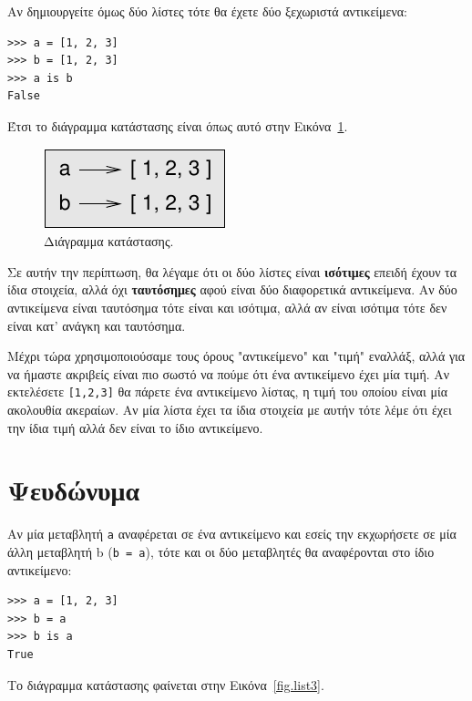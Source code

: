 \documentclass[10pt]{book}
\begin{document}
Αν δημιουργείτε όμως δύο λίστες τότε θα έχετε δύο ξεχωριστά αντικείμενα:

\begin{verbatim}
>>> a = [1, 2, 3]
>>> b = [1, 2, 3]
>>> a is b
False
\end{verbatim}
%
Έτσι το διάγραμμα κατάστασης είναι όπως αυτό στην Εικόνα~\ref{fig.list2}.

\begin{figure}
\centerline
{\includegraphics[scale=0.8]{figs/list2.pdf}}
 \caption{Διάγραμμα κατάστασης.} 
\label{fig.list2}
\end{figure}


Σε αυτήν την περίπτωση, θα λέγαμε ότι οι δύο λίστες είναι {\bf ισότιμες} επειδή έχουν τα ίδια στοιχεία, αλλά όχι {\bf ταυτόσημες} αφού είναι δύο διαφορετικά αντικείμενα. Αν δύο αντικείμενα είναι ταυτόσημα τότε είναι και ισότιμα, αλλά αν είναι ισότιμα τότε δεν είναι κατ' ανάγκη και ταυτόσημα.

Μέχρι τώρα χρησιμοποιούσαμε τους όρους "αντικείμενο" και "τιμή" εναλλάξ, αλλά για να ήμαστε ακριβείς είναι πιο σωστό να πούμε ότι ένα αντικείμενο έχει μία τιμή. Αν εκτελέσετε {\tt [1,2,3]} θα πάρετε ένα αντικείμενο λίστας, η τιμή του οποίου είναι μία ακολουθία ακεραίων. Αν μία λίστα έχει τα ίδια στοιχεία με αυτήν τότε λέμε ότι έχει την ίδια τιμή αλλά δεν είναι το ίδιο αντικείμενο.


\section{Ψευδώνυμα}

Αν μία μεταβλητή {\tt a} αναφέρεται σε ένα αντικείμενο και εσείς την εκχωρήσετε σε μία άλλη μεταβλητή b ({\tt b = a}), τότε και οι δύο μεταβλητές θα αναφέρονται στο ίδιο αντικείμενο:

\begin{verbatim}
>>> a = [1, 2, 3]
>>> b = a
>>> b is a
True
\end{verbatim}
%
 
Το διάγραμμα κατάστασης φαίνεται στην Εικόνα~\ref{fig.list3}.
\end{document}
